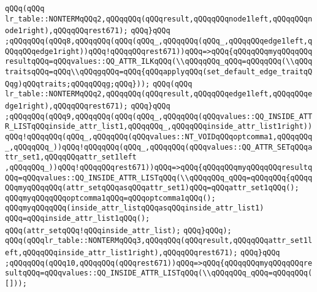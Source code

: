 \verb|qQQq(qQQq|\newline
\verb|lr_table::NONTERMqQQq2,qQQqqQQq(qQQqresult,qQQqqQQqnode1left,qQQqqQQqnode1right),qQQqqQQqrest671);|\newline
\verb|qQQq}qQQq|\newline
\verb|;qQQqqQQq(qQQq8,qQQqqQQq(qQQq(qQQq_,qQQqqQQq(qQQq_,qQQqqQQqedge1left,qQQqqQQqedge1right))qQQq!qQQqqQQqrest671))qQQq=>qQQq{qQQqqQQqmyqQQqqQQqresultqQQq=qQQqvalues::QQ_ATTR_ILKqQQq(\\qQQqqQQq_qQQq=qQQqqQQq(\\qQQqtraitsqQQq=qQQq\\qQQqgqQQq=qQQq{qQQqapplyqQQq(set_default_edge_traitqQQqg)qQQqtraits;qQQqqQQqg;qQQq}));|\newline
\verb|qQQq(qQQq|\newline
\verb|lr_table::NONTERMqQQq2,qQQqqQQq(qQQqresult,qQQqqQQqedge1left,qQQqqQQqedge1right),qQQqqQQqrest671);|\newline
\verb|qQQq}qQQq|\newline
\verb|;qQQqqQQq(qQQq9,qQQqqQQq(qQQq(qQQq_,qQQqqQQq(qQQqvalues::QQ_INSIDE_ATTR_LISTqQQqinside_attr_list1,qQQqqQQq_,qQQqqQQqinside_attr_list1right))qQQq!qQQqqQQq(qQQq_,qQQqqQQq(qQQqvalues::NT_VOIDqQQqoptcomma1,qQQqqQQq_,qQQqqQQq_))qQQq!qQQqqQQq(qQQq_,qQQqqQQq(qQQqvalues::QQ_ATTR_SETqQQqattr_set1,qQQqqQQqattr_set1left|\newline
\verb|,qQQqqQQq_))qQQq!qQQqqQQqrest671))qQQq=>qQQq{qQQqqQQqmyqQQqqQQqresultqQQq=qQQqvalues::QQ_INSIDE_ATTR_LISTqQQq(\\qQQqqQQq_qQQq=qQQqqQQq{qQQqqQQqmyqQQqqQQq(attr_setqQQqasqQQqattr_set1)qQQq=qQQqattr_set1qQQq();|\newline
\verb|qQQqmyqQQqqQQqoptcomma1qQQq=qQQqoptcomma1qQQq();|\newline
\verb|qQQqmyqQQqqQQq(inside_attr_listqQQqasqQQqinside_attr_list1)|\newline
\verb|qQQq=qQQqinside_attr_list1qQQq();|\newline
\verb|qQQq(attr_setqQQq!qQQqinside_attr_list);|\newline
\verb|qQQq}qQQq);|\newline
\verb|qQQq(qQQqlr_table::NONTERMqQQq3,qQQqqQQq(qQQqresult,qQQqqQQqattr_set1left,qQQqqQQqinside_attr_list1right),qQQqqQQqrest671);|\newline
\verb|qQQq}qQQq|\newline
\verb|;qQQqqQQq(qQQq10,qQQqqQQq(qQQqrest671))qQQq=>qQQq{qQQqqQQqmyqQQqqQQqresultqQQq=qQQqvalues::QQ_INSIDE_ATTR_LISTqQQq(\\qQQqqQQq_qQQq=qQQqqQQq([]));|\newline
